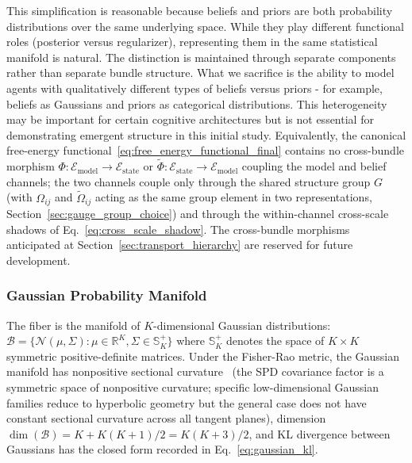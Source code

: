 \documentclass[11pt]{article}
\begin{document}
This simplification is reasonable because beliefs and priors are both probability distributions over the same underlying space. While they play different functional roles (posterior versus regularizer), representing them in the same statistical manifold is natural. The distinction is maintained through separate components rather than separate bundle structure. What we sacrifice is the ability to model agents with qualitatively different types of beliefs versus priors - for example, beliefs as Gaussians and priors as categorical distributions. This heterogeneity may be important for certain cognitive architectures but is not essential for demonstrating emergent structure in this initial study. Equivalently, the canonical free-energy functional~\eqref{eq:free_energy_functional_final} contains no cross-bundle morphism $\Phi: \mathcal{E}_{\mathrm{model}} \to \mathcal{E}_{\mathrm{state}}$ or $\tilde{\Phi}: \mathcal{E}_{\mathrm{state}} \to \mathcal{E}_{\mathrm{model}}$ coupling the model and belief channels; the two channels couple only through the shared structure group $G$ (with $\Omega_{ij}$ and $\tilde{\Omega}_{ij}$ acting as the same group element in two representations, Section~\ref{sec:gauge_group_choice}) and through the within-channel cross-scale shadows of Eq.~\eqref{eq:cross_scale_shadow}. The cross-bundle morphisms anticipated at Section~\ref{sec:transport_hierarchy} are reserved for future development.

\subsubsection{Gaussian Probability Manifold}

The fiber is the manifold of $K$-dimensional Gaussian distributions: $\mathcal{B} = \{\mathcal{N}(\mu, \Sigma) : \mu \in \mathbb{R}^K, \Sigma \in \mathbb{S}^+_K\}$ where $\mathbb{S}^+_K$ denotes the space of $K \times K$ symmetric positive-definite matrices. Under the Fisher-Rao metric, the Gaussian manifold has nonpositive sectional curvature~\cite{Amari2016} (the SPD covariance factor is a symmetric space of nonpositive curvature; specific low-dimensional Gaussian families reduce to hyperbolic geometry but the general case does not have constant sectional curvature across all tangent planes), dimension $\dim(\mathcal{B}) = K + K(K+1)/2 = K(K+3)/2$, and KL divergence between Gaussians has the closed form recorded in Eq.~\eqref{eq:gaussian_kl}.
\end{document}
